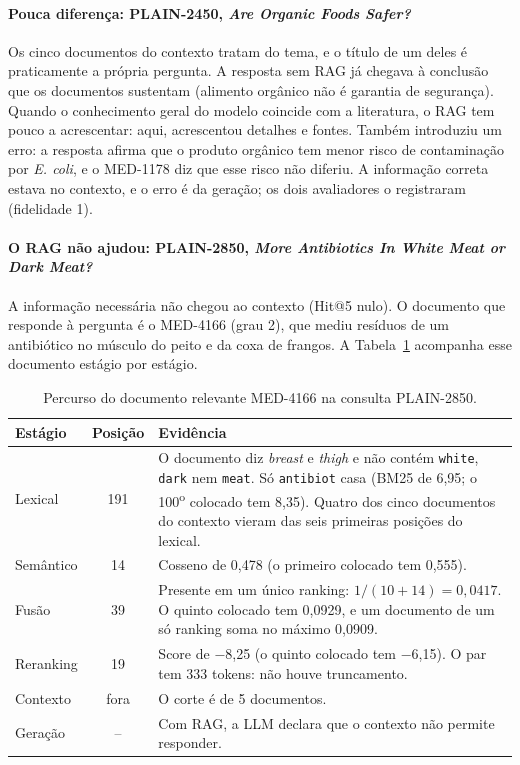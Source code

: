 \documentclass[11pt,a4paper]{article}
\newcommand{\cod}[1]{\texttt{#1}}
\begin{document}
\paragraph{Pouca diferença: PLAIN-2450, \emph{Are Organic Foods Safer?}} Os cinco documentos do contexto tratam do tema, e o título de um deles é praticamente a própria pergunta. A resposta sem RAG já chegava à conclusão que os documentos sustentam (alimento orgânico não é garantia de segurança). Quando o conhecimento geral do modelo coincide com a literatura, o RAG tem pouco a acrescentar: aqui, acrescentou detalhes e fontes. Também introduziu um erro: a resposta afirma que o produto orgânico tem menor risco de contaminação por \emph{E. coli}, e o MED-1178 diz que esse risco não diferiu. A informação correta estava no contexto, e o erro é da geração; os dois avaliadores o registraram (fidelidade 1).

\paragraph{O RAG não ajudou: PLAIN-2850, \emph{More Antibiotics In White Meat or Dark Meat?}} A informação necessária não chegou ao contexto (Hit@5 nulo). O documento que responde à pergunta é o MED-4166 (grau 2), que mediu resíduos de um antibiótico no músculo do peito e da coxa de frangos. A Tabela~\ref{tab:falha} acompanha esse documento estágio por estágio.

\begin{table}[!htb]
\centering\small
\caption{Percurso do documento relevante MED-4166 na consulta PLAIN-2850.}
\label{tab:falha}
\begin{tabular}{lcp{10.2cm}}
\toprule
Estágio & Posição & Evidência \\
\midrule
Lexical & 191 & O documento diz \emph{breast} e \emph{thigh} e não contém \cod{white}, \cod{dark} nem \cod{meat}. Só \cod{antibiot} casa (BM25 de 6,95; o 100\textsuperscript{o} colocado tem 8,35). Quatro dos cinco documentos do contexto vieram das seis primeiras posições do lexical. \\
Semântico & 14 & Cosseno de 0,478 (o primeiro colocado tem 0,555). \\
Fusão & 39 & Presente em um único ranking: $1/(10+14)=0{,}0417$. O quinto colocado tem 0,0929, e um documento de um só ranking soma no máximo 0,0909. \\
Reranking & 19 & Score de $-$8,25 (o quinto colocado tem $-$6,15). O par tem 333 tokens: não houve truncamento. \\
Contexto & fora & O corte é de 5 documentos. \\
Geração & -- & Com RAG, a LLM declara que o contexto não permite responder. \\
\bottomrule
\end{tabular}
\end{table}
\end{document}

